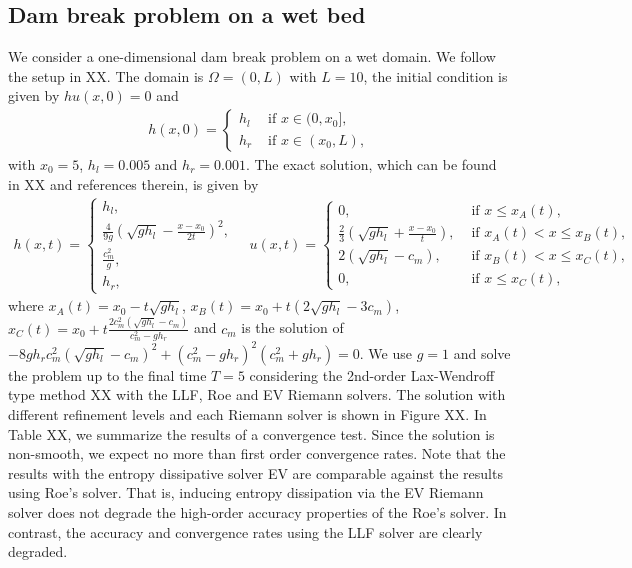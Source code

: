 \documentclass[preprint, 11pt]{article}
\begin{document}
\subsection{Dam break problem on a wet bed}
We consider a one-dimensional dam break problem on a wet domain. 
We follow the setup in XX. 
The domain is $\Omega=(0,L)$ with $L=10$, the initial condition is given by 
$hu(x,0)=0$ and 
\begin{align*}
  h(x,0) = 
  \begin{cases}
    h_l & \mbox{ if } x\in(0,x_0], \\
    h_r & \mbox{ if } x\in(x_0,L),
  \end{cases}
\end{align*}
with $x_0=5$, $h_l=0.005$ and $h_r=0.001$. 
The exact solution, which can be found in XX and references therein, is given by 
\begin{align*}
  h(x,t) = 
  \begin{cases}
    h_l, \\
    \frac{4}{9g}\left(\sqrt{gh_l}-\frac{x-x_0}{2t}\right)^2, \\
    \frac{c_m^2}{g}, \\
    h_r, 
  \end{cases}
\quad 
  u(x,t) = 
  \begin{cases}
    0, &\mbox{ if } x\leq x_A(t), \\
    \frac{2}{3}\left(\sqrt{gh_l}+\frac{x-x_0}{t}\right), & \mbox{ if } x_A(t) < x\leq x_B(t), \\
    2(\sqrt{gh_l}-c_m), & \mbox{ if } x_B(t)<x\leq x_C(t), \\
    0, &\mbox{ if } x\leq x_C(t),
  \end{cases}
\end{align*}
where $x_A(t)=x_0-t\sqrt{gh_l}$, $x_B(t)=x_0+t\left(2\sqrt{gh_l}-3c_m\right)$, 
$x_C(t)=x_0+t\frac{2c_m^2\left(\sqrt{gh_l}-c_m\right)}{c_m^2-gh_r}$ and 
$c_m$ is the solution of 
$-8gh_rc_m^2\left(\sqrt{gh_l}-c_m\right)^2+\left(c_m^2-gh_r\right)^2\left(c_m^2+gh_r\right)=0$.
We use $g=1$ and solve the problem up to the final time $T=5$ considering the 2nd-order Lax-Wendroff 
type method XX with the LLF, Roe and EV Riemann solvers. The solution with different refinement levels 
and each Riemann solver is shown in Figure XX. In Table XX, we summarize the results of a convergence test. 
Since the solution is non-smooth, we expect no more than first order convergence rates. Note that the 
results with the entropy dissipative solver EV are comparable against the results using Roe's solver. 
That is, inducing entropy dissipation via the EV Riemann solver does not degrade the high-order accuracy 
properties of the Roe's solver. 
In contrast, the accuracy and convergence rates using the LLF solver are clearly degraded.  
\end{document}

